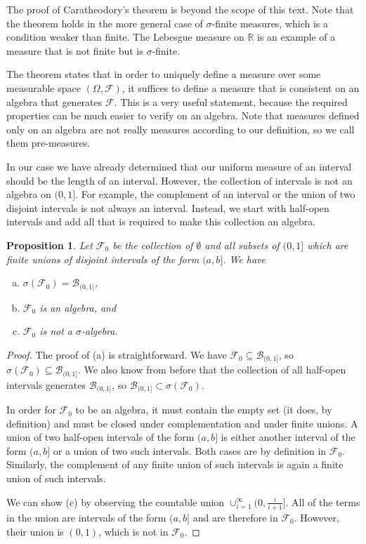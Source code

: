 \documentclass{book}
\theoremstyle{plain}%
\newtheorem{proposition}{Proposition}[section]
\theoremstyle{definition}
\begin{document}
The proof of Caratheodory's theorem is beyond the scope of this text. Note that the theorem holds in the more general case of $\sigma$-finite measures, which is a condition weaker than finite. The Lebesgue measure on $\mathbb{R}$ is an example of a measure that is not finite but is $\sigma$-finite.

The theorem states that in order to uniquely define a measure over some measurable space $(\Omega, \mathcal{F})$, it suffices to define a measure that is consistent on an algebra that generates $\mathcal{F}$. This is a very useful statement, because the required properties can be much easier to verify on an algebra. Note that measures defined only on an algebra are not really measures according to our definition, so we call them pre-measures.

In our case we have already determined that our uniform measure of an interval should be the length of an interval. However, the collection of intervals is not an algebra on $(0,1]$. For example, the complement of an interval or the union of two disjoint intervals is not always an interval. Instead, we start with half-open intervals and add all that is required to make this collection an algebra.

\begin{proposition} Let $\mathcal{F}_0$ be the collection of $\emptyset$ and all subsets of $(0, 1]$ which are finite unions of disjoint intervals of the form $(a, b]$. We have

\begin{enumerate}[(a)]
\item $\sigma(\mathcal{F}_0) = \mathcal{B}_{(0,1]} $,
\item $\mathcal{F}_0$ is an algebra, and
\item $\mathcal{F}_0$ is not a $\sigma$-algebra.
\end{enumerate}
\end{proposition}

\begin{proof}
The proof of (a) is straightforward. We have $\mathcal{F}_0 \subseteq \mathcal{B}_{(0,1]}$, so $\sigma(\mathcal{F}_0) \subseteq \mathcal{B}_{(0,1]}$. We also know from before that the collection of all half-open intervals generates $\mathcal{B}_{(0,1]}$, so $\mathcal{B}_{(0,1]} \subset \sigma(\mathcal{F}_0)$.

In order for $\mathcal{F}_0$ to be an algebra, it must contain the empty set (it does, by definition) and must be closed under complementation and under finite unions. A union of two half-open intervals of the form $(a, b]$ is either another interval of the form $(a, b]$ or a union of two such intervals. Both cases are by definition in $\mathcal{F}_0$. Similarly, the complement of any finite union of such intervals is again a finite union of such intervals.

We can show (c) by observing the countable union $\cup_{i=1}^\infty (0, \frac{i}{i+1}]$. All of the terms in the union are intervals of the form $(a, b]$ and are therefore in $\mathcal{F}_0$. However, their union is $(0, 1)$, which is not in $\mathcal{F}_0$.
\end{proof}
\end{document}
